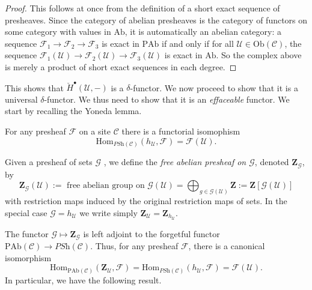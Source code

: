 \begin{proof}
This follows at once from the definition of a short exact sequence of 
presheaves. Since the category of abelian presheaves is the category of 
functors on some category with values in $\text{Ab}$, it is automatically an 
abelian category: a sequence $\mathcal{F}_1\to \mathcal{F}_2\to \mathcal{F}_3$ 
is exact in $\text{PAb}$ if and only if for all $\mathcal{U}\in 
\text{Ob}(\mathcal{C})$, the sequence $\mathcal{F}_1(\mathcal{U})\to 
\mathcal{F}_2(\mathcal{U})\to \mathcal{F}_3(\mathcal{U})$ is exact in 
$\text{Ab}$. So the complex above is merely a product of short exact sequences 
in each degree.
\end{proof}
  
\noindent
This shows that $\check{H}^\bullet(\mathcal{U}, -)$ is a $\delta$-functor. 
We now proceed to show that it is a universal $\delta$-functor. We thus need to 
show that it is an \emph{effaceable} functor. We start by recalling the Yoneda 
lemma.
  
\begin{lemma}
For any presheaf $\mathcal{F}$ on a site $\mathcal{C}$ there is a 
functorial isomophism
$$
\text{Hom}_{\textit{PSh}(\mathcal{C})} (h_{\mathcal{U}}, \mathcal{F}) = 
\mathcal{F}(\mathcal{U}).
$$
\end{lemma}
  
\begin{definition}
Given a presheaf of sets $\mathcal{G}$ , we define the \emph{free abelian 
presheaf on $\mathcal{G}$}, denoted $\mathbf{Z}_{\mathcal{G}}$, by
$$
    \mathbf{Z}_{\mathcal{G}}(\mathcal{U}) := \text{ free abelian group on 
}\mathcal{G}(\mathcal{U}) = \bigoplus_{g\in \mathcal{G}(\mathcal{U})}\mathbf{Z} 
 := \mathbf{Z}\left[\mathcal{G}(\mathcal{U})\right]
  $$
  with restriction maps induced by the original restriction maps of sets. In 
the special case $\mathcal{G} = h_\mathcal{U}$ we write simply 
$\mathbf{Z}_\mathcal{U} = \mathbf{Z}_{h_\mathcal{U}}$.
\end{definition}
  
\noindent
The functor $\mathcal{G} \mapsto \mathbf{Z}_\mathcal{G}$ is left adjoint to 
the forgetful functor $\text{PAb}(\mathcal{C}) \to \textit{PSh}(\mathcal{C})$.
Thus, for any presheaf $\mathcal{F}$, there is a canonical isomorphism
 $$
    \text{Hom}_{\text{PAb}(\mathcal{C})}\left(\mathbf{Z}_\mathcal{U}, 
\mathcal{F}\right)=
    \text{Hom}_{\textit{PSh}(\mathcal{C})}(h_\mathcal{U}, \mathcal{F}) = 
\mathcal{F}(\mathcal{U}).
$$
In particular, we have the following result.

